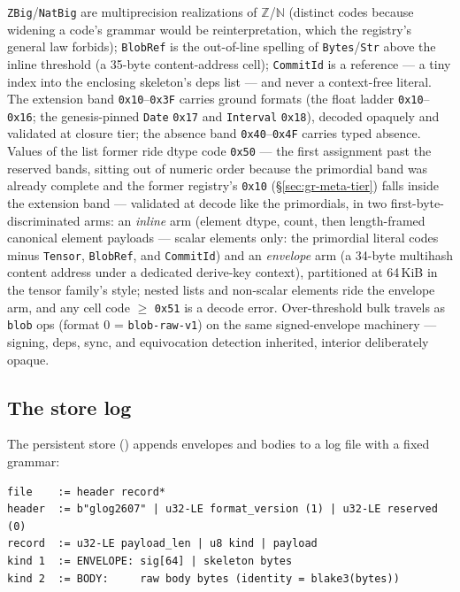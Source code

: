 \noindent \texttt{ZBig}/\texttt{NatBig} are multiprecision
realizations of $\mathbb{Z}$/$\mathbb{N}$ (distinct codes because
widening a code's grammar would be reinterpretation, which the
registry's general law forbids); \texttt{BlobRef} is the out-of-line
spelling of \texttt{Bytes}/\texttt{Str} above the inline threshold (a
35-byte content-address cell); \texttt{CommitId} is a reference — a
tiny index into the enclosing skeleton's deps list — and never a
context-free literal. The extension band \texttt{0x10}–\texttt{0x3F}
carries ground formats (the float ladder \texttt{0x10}–\texttt{0x16};
the genesis-pinned \texttt{Date} \texttt{0x17} and \texttt{Interval}
\texttt{0x18}), decoded opaquely and validated at closure tier; the
absence band \texttt{0x40}–\texttt{0x4F} carries typed absence.
Values of the list former ride dtype code \texttt{0x50} — the first
assignment past the reserved bands, sitting out of numeric order
because the primordial band was already complete and the former
registry's \texttt{0x10} (\S\ref{sec:gr-meta-tier}) falls inside the
extension band — validated at decode like the primordials, in two
first-byte-discriminated arms: an \emph{inline} arm (element dtype,
count, then length-framed canonical element payloads — scalar
elements only: the primordial literal codes minus \texttt{Tensor},
\texttt{BlobRef}, and \texttt{CommitId}) and an \emph{envelope} arm
(a 34-byte multihash content address under a dedicated derive-key
context), partitioned at 64\,KiB in the tensor family's style;
nested lists and non-scalar elements ride the envelope arm, and any
cell code $\geq$ \texttt{0x51} is a decode error.
Over-threshold bulk travels as \texttt{blob} ops (format 0 =
\texttt{blob-raw-v1}) on the same signed-envelope machinery —
signing, deps, sync, and equivocation detection inherited, interior
deliberately opaque.

\subsection{The store log}
\label{sec:gr-store}

The persistent store () appends envelopes
and bodies to a log file with a fixed grammar:

\begin{Verbatim}[fontsize=\small,frame=leftline,rulecolor=\color{accentmid},framesep=3mm,xleftmargin=3mm]
file    := header record*
header  := b"glog2607" | u32-LE format_version (1) | u32-LE reserved (0)
record  := u32-LE payload_len | u8 kind | payload
kind 1  := ENVELOPE: sig[64] | skeleton bytes
kind 2  := BODY:     raw body bytes (identity = blake3(bytes))
\end{Verbatim}

